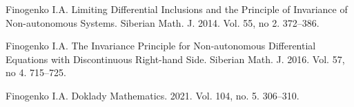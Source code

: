 \documentclass[12pt]{llncs}
\begin{document}
%







\begin{thebibliography}{5}
	
 Finogenko I.A. Limiting Differential Inclusions and the Principle of Invariance of Non-autonomous Systems. Siberian Math. J. 2014.  Vol. 55, no 2.   372--386.

  Finogenko I.A. The Invariance Principle for Non-autonomous Differential Equations with Discontinuous Right-hand Side.  Siberian Math. J. 2016.  Vol. 57, no 4.  715--725.  
	
 Finogenko I.A. Doklady Mathematics. 2021.  Vol. 104, no. 5. 306--310.	
	

	

\end{thebibliography}
\end{document}
